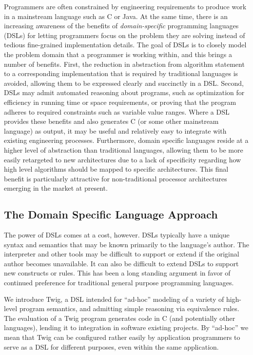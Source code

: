 \documentclass{acm_proc_article-sp}
\begin{document}
Programmers are often constrained by engineering requirements to produce work
in a mainstream language such as C or Java. At the same time, there is an
increasing awareness of the benefits of \emph{domain-specific} programming
languages (DSLs) for letting programmers focus on the problem they are solving
instead of tedious fine-grained implementation details.  The goal of DSLs is to
closely model the problem domain that a programmer is working within, and this
brings a number of benefits. First, the reduction in abstraction from
algorithm statement to a corresponding implementation that is required by
traditional languages is avoided, allowing them to be expressed clearly and
succinctly in a DSL. Second, DSLs may admit automated reasoning about
programs, such as optimization for efficiency in running time or space
requirements, or proving that the program adheres to required constraints such
as variable value ranges. Where a DSL provides these benefits and also
generates C (or some other mainstream language) as output, it may be useful
and relatively easy to integrate with existing engineering processes.
Furthermore, domain specific languages reside at a higher level of abstraction
than traditional languages, allowing them to be more easily retargeted to new
architectures due to a lack of specificity regarding how high level algorithms
should be mapped to specific architectures. This final benefit is particularly
attractive for non-traditional processor architectures emerging in the market
at present.

\subsection{The Domain Specific Language Approach}

The power of DSLs comes at a cost, however. DSLs typically have a unique
syntax and semantics that may be known primarily to the language's author. The
interpreter and other tools may be difficult to support or extend if the
original author becomes unavailable. It can also be difficult to extend DSLs
to support new constructs or rules. This has been a long standing argument in
favor of continued preference for traditional general purpose programming
languages.


We introduce Twig, a DSL intended for ``ad-hoc'' modeling of a variety of
high-level program semantics, and admitting simple reasoning via equivalence
rules. The evaluation of a Twig program generates code in C (and potentially
other languages), lending it to integration in software existing projects. By
``ad-hoc'' we mean that Twig can be configured rather easily by application
programmers to serve as a DSL for different purposes, even within the same
application. 
\end{document}
